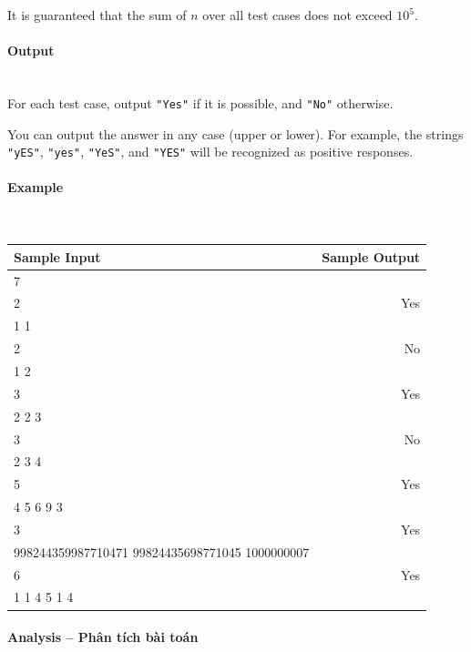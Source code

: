 \documentclass{article}
\begin{document}
It is guaranteed that the sum of $n$ over all test cases does not exceed $10^5$.

\paragraph{Output}\mbox{} \\


For each test case, output \texttt{"Yes"} if it is possible, and \texttt{"No"} otherwise.

You can output the answer in any case (upper or lower). For example, the strings \texttt{"yES"}, \texttt{"yes"}, \texttt{"YeS"}, and \texttt{"YES"} will be recognized as positive responses.

\paragraph{Example}\mbox{} \\

\begin{table}[h]
    \centering
    \begin{tabular}{|l|r|}
        \hline
        \rowcolor{gray!30}
        \textbf{Sample Input} & \textbf{Sample Output} \\
        \hline
        7 & \\
        2 & Yes \\
        1 1 & \\
        2 & No \\
        1 2 & \\
        3 & Yes \\
        2 2 3 & \\
        3 & No \\
        2 3 4 & \\
        5 & Yes \\
        4 5 6 9 3 & \\
        3 & Yes \\
        998244359987710471 99824435698771045 1000000007 & \\
        6 & Yes \\
        1 1 4 5 1 4 & \\
        \hline
    \end{tabular}
\end{table}

\paragraph{Analysis -- Phân tích bài toán} \mbox{} \\
\end{document}

